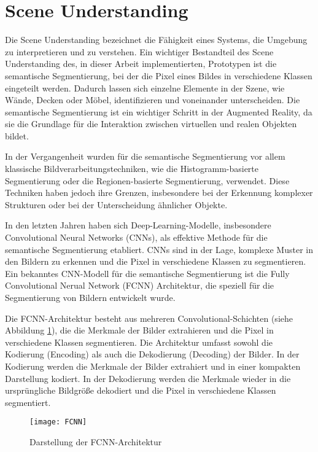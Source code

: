 \section{Scene Understanding} \label{sec:SceneUnderstanding}

Die Scene Understanding bezeichnet die Fähigkeit eines Systems, die Umgebung zu interpretieren und zu verstehen. Ein wichtiger Bestandteil des Scene Understanding des, in dieser Arbeit implementierten, Prototypen ist die semantische Segmentierung, bei der die Pixel eines Bildes in verschiedene Klassen eingeteilt werden. Dadurch lassen sich einzelne Elemente in der Szene, wie Wände, Decken oder Möbel, identifizieren und voneinander unterscheiden. Die semantische Segmentierung ist ein wichtiger Schritt in der Augmented Reality, da sie die Grundlage für die Interaktion zwischen virtuellen und realen Objekten bildet. \cite{szeliski2022computerVision}

In der Vergangenheit wurden für die semantische Segmentierung vor allem klassische Bildverarbeitungstechniken, wie die Histogramm-basierte Segmentierung oder die Regionen-basierte Segmentierung, verwendet. Diese Techniken haben jedoch ihre Grenzen, insbesondere bei der Erkennung komplexer Strukturen oder bei der Unterscheidung ähnlicher Objekte. \cite{szeliski2022computerVision}

In den letzten Jahren haben sich Deep-Learning-Modelle, insbesondere Convolutional Neural Networks (CNNs), als effektive Methode für die semantische Segmentierung etabliert. CNNs sind in der Lage, komplexe Muster in den Bildern zu erkennen und die Pixel in verschiedene Klassen zu segmentieren. Ein bekanntes CNN-Modell für die semantische Segmentierung ist die Fully Convolutional Nerual Network (FCNN) Architektur, die speziell für die Segmentierung von Bildern entwickelt wurde. \cite{long2014fcnn}

Die FCNN-Architektur besteht aus mehreren Convolutional-Schichten (siehe Abbildung \ref{fig:FCNN}), die die Merkmale der Bilder extrahieren und die Pixel in verschiedene Klassen segmentieren. Die Architektur umfasst sowohl die Kodierung (Encoding) als auch die Dekodierung (Decoding) der Bilder. In der Kodierung werden die Merkmale der Bilder extrahiert und in einer kompakten Darstellung kodiert. In der Dekodierung werden die Merkmale wieder in die ursprüngliche Bildgröße dekodiert und die Pixel in verschiedene Klassen segmentiert. \cite{long2014fcnn}

\begin{figure}
    \centering
    \texttt{[image: FCNN]}
    \caption{Darstellung der FCNN-Architektur \cite{long2014fcnn}\label{fig:FCNN}}\par
\end{figure}


